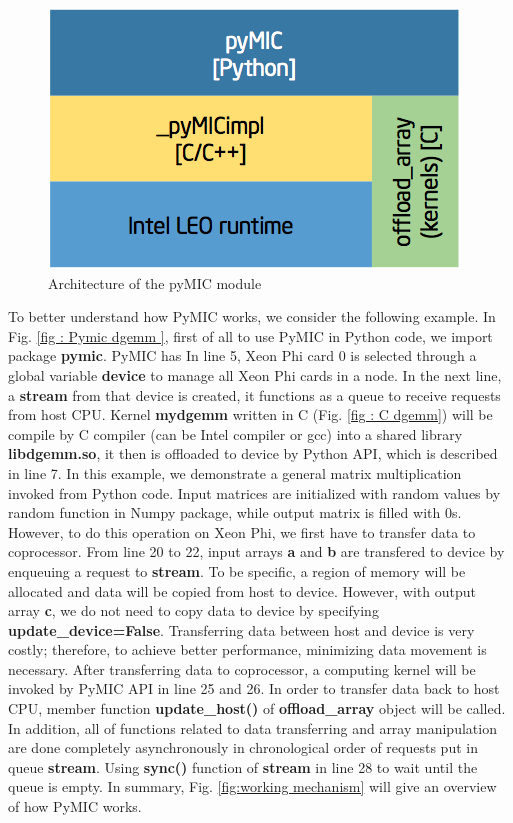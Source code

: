 \begin{figure}[h]
\centering
\includegraphics[scale=0.5]{img/pymic-arch.png}
\caption{Architecture of the pyMIC module}
\label{fig:pymic-arch}
\end{figure}

To better understand how PyMIC works, we consider the following example. In Fig. \ref{fig : Pymic dgemm }, first of all to use PyMIC in Python code, we import package \textbf{pymic}. PyMIC has  In line 5, Xeon Phi card 0 is selected through a global variable \textbf{device} to manage all Xeon Phi cards in a node. In the next line, a \textbf{stream} from that device is created, it functions as a queue to receive requests from host CPU. Kernel \textbf{mydgemm} written in C (Fig. \ref{fig : C dgemm}) will be compile by C compiler (can be Intel compiler or gcc) into a shared library \textbf{libdgemm.so}, it then is offloaded to device by Python API, which is described in line 7. In this example, we demonstrate a general matrix multiplication invoked from Python code. Input matrices are initialized  with random values by random function in Numpy package, while output matrix is filled with 0s. However, to do this operation on Xeon Phi, we first have to transfer data to coprocessor. From line 20 to 22, input arrays \textbf{a} and \textbf{b} are transfered to device by enqueuing a request to \textbf{stream}. To be specific, a region of memory will be allocated and data will be copied from host to device. However, with output array \textbf{c}, we do not need to copy data to device by specifying \textbf{update\_device=False}. Transferring data between host and device is very costly; therefore, to achieve better performance, minimizing data movement is necessary. After transferring data to coprocessor, a computing kernel will be invoked by PyMIC API in line 25 and 26. In order to transfer data back to host CPU, member function \textbf{update\_host()} of \textbf{offload\_array} object will be called. In addition, all of functions related to data transferring and array manipulation are done completely asynchronously in chronological order of requests put in queue \textbf{stream}. Using \textbf{sync()} function  of \textbf{stream} in line 28 to wait until the queue is empty. In summary, Fig. \ref{fig:working mechanism} will give an overview of how PyMIC works.

